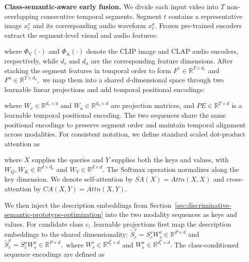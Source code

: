 \textbf{Class-semantic-aware early fusion. }We divide each input video into $T$ non-overlapping consecutive temporal segments. Segment $t$ contains a representative image ${x}_{t}^{v}$ and its corresponding audio waveform ${x}_{t}^{a}.$ Frozen pre-trained encoders extract the segment-level visual and audio features:




\noindent\unskip where ${\Phi }_{\mathrm{V}}(\cdot )$ and ${\Phi }_{\mathrm{A}}(\cdot )$ denote the CLIP image and CLAP audio encoders, respectively, while ${d}_{v}$ and ${d}_{a}$ are the corresponding feature dimensions. After stacking the segment features in temporal order to form ${F}^{v}\in {\mathbb{R}}^{T\times {d}_{v}}$ and ${F}^{a}\in {\mathbb{R}}^{T\times {d}_{a}},$ we map them into a shared $d$-dimensional space through two learnable linear projections and add temporal positional encodings:


\noindent\unskip where ${W}_{v}\in {\mathbb{R}}^{{d}_{v}\times d}$ and ${W}_{a}\in {\mathbb{R}}^{{d}_{a}\times d}$ are projection matrices, and $PE\in {\mathbb{R}}^{T\times d}$ is a learnable temporal positional encoding. The two sequences share the same positional encodings to preserve segment order and maintain temporal alignment across modalities. For consistent notation, we define standard scaled dot-product attention as


\noindent\unskip where $X$ supplies the queries and $Y$ supplies both the keys and values, with ${W}_{Q},{W}_{K}\in {\mathbb{R}}^{d\times {d}_{k}}$ and ${W}_{V}\in {\mathbb{R}}^{d\times d}.$ The $\mathrm{Softmax}$ operation normalizes along the key dimension. We denote self-attention by $SA(X)=Attn(X,X)$ and cross-attention by $CA(X,Y)=Attn(X,Y).$

We then inject the description embeddings from Section~\ref{sec:discriminative-semantic-prototype-optimization} into the two modality sequences as keys and values. For candidate class $c,$ learnable projections first map the description embeddings to the shared dimensionality: ${\widetilde{S}}_{c}^{v}={S}_{c}^{v}{W}_{s}^{v}\in {\mathbb{R}}^{P\times d}$ and ${\widetilde{S}}_{c}^{a}={S}_{c}^{a}{W}_{s}^{a}\in {\mathbb{R}}^{P\times d},$ where ${W}_{s}^{v}\in {\mathbb{R}}^{{d}_{t}^{v}\times d}$ and ${W}_{s}^{a}\in {\mathbb{R}}^{{d}_{t}^{a}\times d}.$ The class-conditioned sequence encodings are defined as

